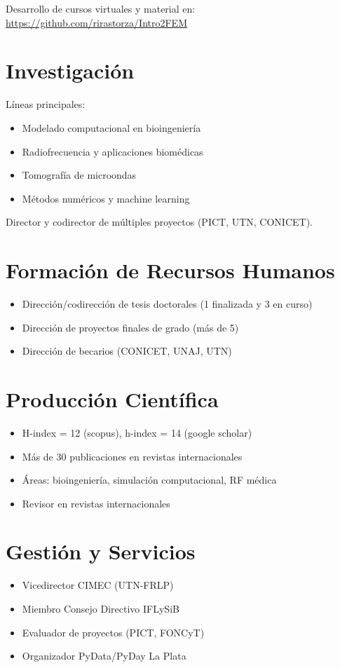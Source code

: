 \documentclass[margin,line]{res}
\begin{document}
\begin{resume}
Desarrollo de cursos virtuales y material en:
\url{https://github.com/rirastorza/Intro2FEM}

\section{\sc Investigación}
Líneas principales:
\begin{itemize}
\item Modelado computacional en bioingeniería
\item Radiofrecuencia y aplicaciones biomédicas
\item Tomografía de microondas
\item Métodos numéricos y machine learning
\end{itemize}

Director y codirector de múltiples proyectos (PICT, UTN, CONICET).

\section{\sc Formación de Recursos Humanos}
\begin{itemize}
\item Dirección/codirección de tesis doctorales (1 finalizada y 3 en curso)
\item Dirección de proyectos finales de grado (más de 5)
\item Dirección de becarios (CONICET, UNAJ, UTN)
\end{itemize}

\section{\sc Producción Científica}
\begin{itemize}
\item H-index = 12 (scopus), h-index = 14 (google scholar)
\item Más de 30 publicaciones en revistas internacionales
\item Áreas: bioingeniería, simulación computacional, RF médica
\item Revisor en revistas internacionales
\end{itemize}

\section{\sc Gestión y Servicios}
\begin{itemize}
\item Vicedirector CIMEC (UTN-FRLP)
\item Miembro Consejo Directivo IFLySiB
\item Evaluador de proyectos (PICT, FONCyT)
\item Organizador PyData/PyDay La Plata
\end{itemize}

\end{resume}
\end{document}

